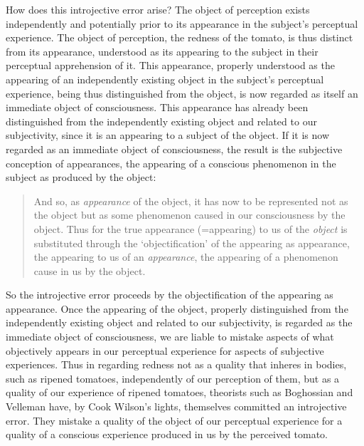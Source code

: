 \documentclass[12pt]{article}
\begin{document}
How does this introjective error arise? The object of perception exists independently and potentially prior to its appearance in the subject's perceptual experience. The object of perception, the redness of the tomato, is thus distinct from its appearance, understood as its appearing to the subject in their perceptual apprehension of it. This appearance, properly understood as the appearing of an independently existing object in the subject's perceptual experience, being thus distinguished from the object, is now regarded as itself an immediate object of consciousness. This appearance has already been distinguished from the independently existing object and related to our subjectivity, since it is an appearing to a subject of the object. If it is now regarded as an immediate object of consciousness, the result is the subjective conception of appearances, the appearing of a conscious phenomenon in the subject as produced by the object:
\begin{quote}
    And so, as \emph{appearance} of the object, it has now to be represented not as the object but as some phenomenon caused in our consciousness by the object. Thus for the true appearance (=appearing) to us of the \emph{object} is substituted through the `objectification' of the appearing as appearance, the appearing to us of an \emph{appearance}, the appearing of a phenomenon cause in us by the object. \citep[\emph{Correspondence with Stout 1904},][796]{Cook-Wilson:1926sf}
\end{quote}
So the introjective error proceeds by the objectification of the appearing as appearance. Once the appearing of the object, properly distinguished from the independently existing object and related to our subjectivity, is regarded as the immediate object of consciousness, we are liable to mistake aspects of what objectively appears in our perceptual experience for aspects of subjective experiences. Thus in regarding redness not as a quality that inheres in bodies, such as ripened tomatoes, independently of our perception of them, but as a quality of our experience of ripened tomatoes, theorists such as Boghossian and Velleman have, by Cook Wilson's lights, themselves committed an introjective error. They mistake a quality of the object of our perceptual experience for a quality of a conscious experience produced in us by the perceived tomato.
\end{document}
